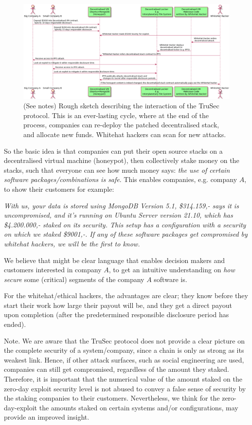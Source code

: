 \begin{figure}[H]
    \centering
    \includegraphics[width=1.0\textwidth]{images/plantuml/interaction.png}
    \caption{(See notes) Rough sketch describing the interaction of the TruSec protocol. This is an ever-lasting cycle, where at the end of the process, companies can re-deploy the patched decentralised stack, and allocate new funds. Whitehat hackers can scan for new attacks.}
    \label{fig:interaction}
\end{figure}
\noindent So the basic idea is that companies can put their open source stacks on a decentralised virtual machine (honeypot), then collectively stake money on the stacks, such that everyone can see how much money says: \textit{the use of certain software packages/combinations is safe}. This enables companies, e.g. company $A$, to show their customers for example:

\textit{With us, your data is stored using MongoDB Version 5.1, \$314.159,- says it is uncompromised, and it's running on Ubuntu Server version 21.10, which has \$4.200.000,- staked on its security. This setup has a configuration with a security on which we staked \$9001,-. If any of these software packages get compromised by whitehat hackers, we will be the first to know.}

We believe that might be clear language that enables decision makers and customers interested in company $A$, to get an intuitive understanding on \textit{how secure} some (critical) segments of the company $A$ software is.

For the whitehat/ethical hackers, the advantages are clear; they know before they start their work how large their payout will be, and they get a direct payout upon completion (after the predetermined responsible disclosure period has ended).

Note. We are aware that the TruSec protocol does not provide a clear picture on the complete security of a system/company, since a chain is only as strong as its weakest link. Hence, if other attack surfaces, such as social engineering are used, companies can still get compromised, regardless of the amount they staked. Therefore, it is important that the numerical value of the amount staked on the zero-day exploit security level is not abused to convey a false sense of security by the staking companies to their customers. Nevertheless, we think for the zero-day-exploit the amounts staked on certain systems and/or configurations, may provide an improved insight.

